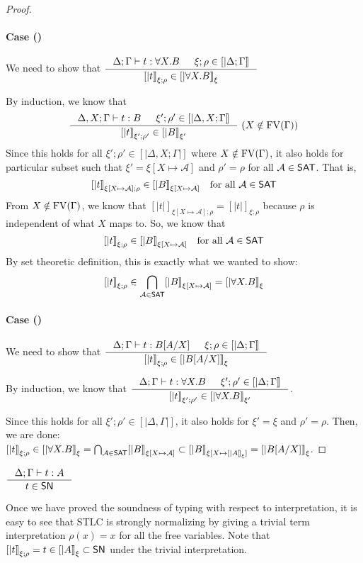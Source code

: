\begin{proof}
\paragraph{Case ()}
We need to show that
$ \inference{\Delta;\Gamma |- t : \forall X.B & \xi;\rho\in[|\Delta;\Gamma|]}
	{[|t|]_{\xi;\rho} \in [|\forall X.B|]_\xi} $

By induction, we know that
\[ \inference{\Delta,X;\Gamma |- t : B & \xi';\rho'\in[|\Delta,X;\Gamma|]}
	{[|t|]_{\xi';\rho'} \in [|B|]_{\xi'}} ~
	(X\notin\FV(\Gamma))
\]
Since this holds for all $\xi';\rho' \in [|\Delta,X;\Gamma|]$ where
$X\notin\mathop{\mathrm{FV}}(\Gamma)$, it also holds for particular subset such that
$\xi' = \xi[X\mapsto\mathcal{A}]$ and $\rho'=\rho$ for all $\mathcal{A}\in\mathsf{SAT}$.
That is,
\[ [|t|]_{\xi[X\mapsto\mathcal{A}];\rho} \in [|B|]_{\xi[X\mapsto\mathcal{A}]}
   \quad \text{for all}~\mathcal{A}\in\mathsf{SAT} \]
From $X\notin\mathop{\mathrm{FV}}(\Gamma)$, we know that
$[|t|]_{\xi[X\mapsto\mathcal{A}];\rho} = [|t|]_{\xi;\rho}$
because $\rho$ is independent of what $X$ maps to.
So, we know that
\[ [|t|]_{\xi;\rho} \in [|B|]_{\xi[X\mapsto\mathcal{A}]}
	\quad \text{for all}~\mathcal{A}\in\mathsf{SAT} \]
By set theoretic definition, this is exactly what we wanted to show:
\[ [|t|]_{\xi;\rho} \in
	\bigcap_{\mathcal{A}\in\mathsf{SAT}} [|B|]_{\xi[X\mapsto\mathcal{A}]}
	= [|\forall X.B|]_\xi
\]

\paragraph{Case ()}
We need to show that
$ \inference{\Delta;\Gamma |- t : B[A/X] & \xi;\rho\in[|\Delta;\Gamma|]}
	{[|t|]_{\xi;\rho} \in [|B[A/X]|]_\xi} $

By induction, we know that
$ \inference{\Delta;\Gamma |- t : \forall X.B & \xi';\rho'\in[|\Delta;\Gamma|]}
	{[|t|]_{\xi';\rho'} \in [|\forall X.B|]_{\xi'}}
$.

Since this holds for all $\xi';\rho' \in [|\Delta,\Gamma|]$,
it also holds for $\xi'=\xi$ and $\rho'=\rho$. Then, we are done:
$ [|t|]_{\xi;\rho} \in [|\forall X.B|]_{\xi}
	= \bigcap_{\mathcal{A}\in\mathsf{SAT}} [|B|]_{\xi[X\mapsto\mathcal{A}]}
	\subset [|B|]_{\xi[X\mapsto[|A|]_\xi]} = [|B[A/X]|]_\xi
$.
\end{proof}
\begin{corollary}
	$\inference{\Delta;\Gamma |- t : A}{t \in \SN}$
\end{corollary}
Once we have proved the soundness of typing with respect to interpretation,
it is easy to see that STLC is strongly normalizing by giving a trivial term
interpretation $\rho(x) = x$ for all the free variables.
Note that $[|t|]_{\xi;\rho} = t \in [|A|]_\xi \subset \mathsf{SN}$
under the trivial interpretation.

